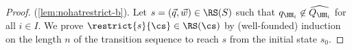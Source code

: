 \begin{proof}
%

\noindent
{ (\ref{lem:nohatrestrict-b})}.
Let $s = (\vec{q},\vec{w}) \in \RS(S)$ such that ${q}_{\HH_i}\not\in\widehat{Q_{\HH_i}}$ for all $i \in I$.
We prove $\restrict{s}{\cs}\in \RS(\cs)$  by (well-founded) induction on the length $n$ of the transition sequence to reach $s$ from the initial state $s_0$.


\end{proof}
